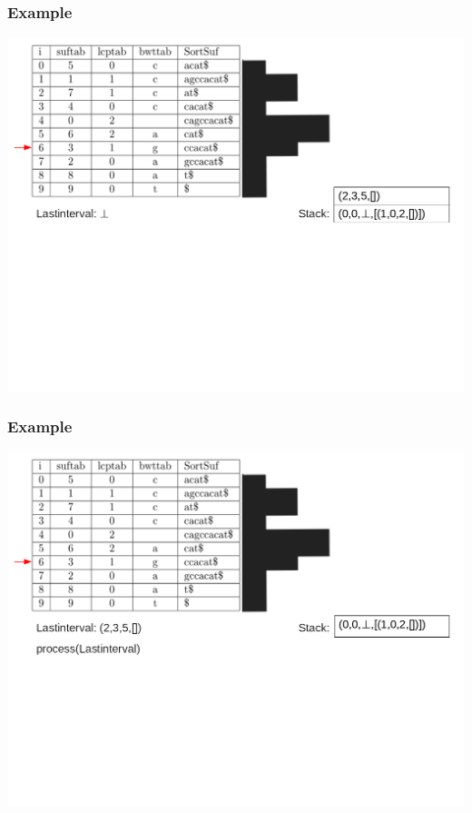 \documentclass[compress,handout]{beamer} %
\begin{document}
\begin{frame}
	\frametitle{Example}
	\includegraphics[width=\textwidth, height=\textheight, keepaspectratio=true]{traversal_9}
\end{frame}

\begin{frame}
	\frametitle{Example}
	\includegraphics[width=\textwidth, height=\textheight, keepaspectratio=true]{traversal_10}
\end{frame}
\end{document}
